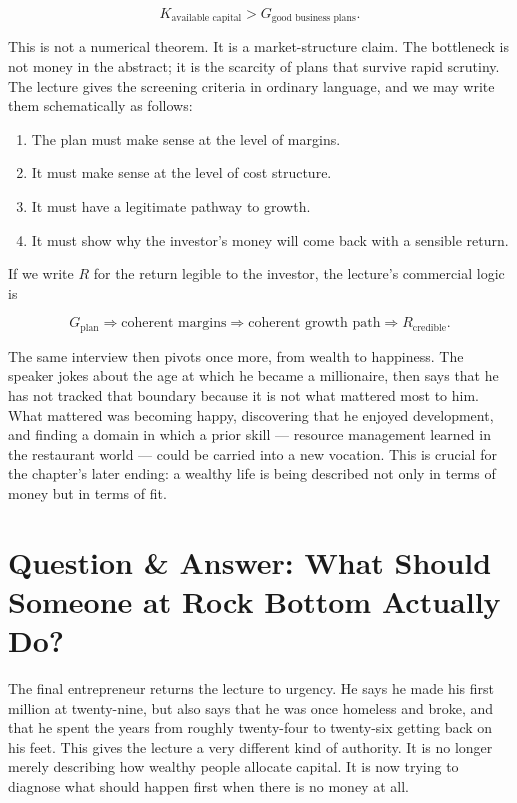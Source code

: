 \begin{equation}
K_{\text{available capital}} > G_{\text{good business plans}}.
\end{equation}

This is not a numerical theorem. It is a market-structure claim. The bottleneck is not money in the abstract; it is the scarcity of plans that survive rapid scrutiny. The lecture gives the screening criteria in ordinary language, and we may write them schematically as follows:

\begin{enumerate}
\item The plan must make sense at the level of margins.
\item It must make sense at the level of cost structure.
\item It must have a legitimate pathway to growth.
\item It must show why the investor's money will come back with a sensible return.
\end{enumerate}

If we write \(R\) for the return legible to the investor, the lecture's commercial logic is

\begin{equation}
G_{\text{plan}} \Rightarrow \text{coherent margins} \Rightarrow \text{coherent growth path} \Rightarrow R_{\text{credible}}.
\end{equation}

The same interview then pivots once more, from wealth to happiness. The speaker jokes about the age at which he became a millionaire, then says that he has not tracked that boundary because it is not what mattered most to him. What mattered was becoming happy, discovering that he enjoyed development, and finding a domain in which a prior skill --- resource management learned in the restaurant world --- could be carried into a new vocation. This is crucial for the chapter's later ending: a wealthy life is being described not only in terms of money but in terms of fit.

\section{Question \& Answer: What Should Someone at Rock Bottom Actually Do?}

The final entrepreneur returns the lecture to urgency. He says he made his first million at twenty-nine, but also says that he was once homeless and broke, and that he spent the years from roughly twenty-four to twenty-six getting back on his feet. This gives the lecture a very different kind of authority. It is no longer merely describing how wealthy people allocate capital. It is now trying to diagnose what should happen first when there is no money at all.

